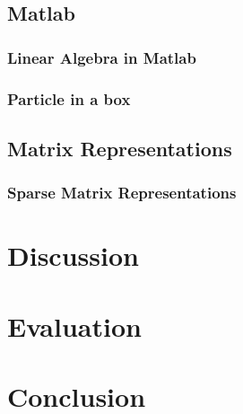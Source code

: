 \documentclass[authoryearcitations]{UoYCSproject}
\begin{document}
\section{Matlab}

\subsection{Linear Algebra in Matlab}


\subsection{Particle in a box}

\section{Matrix Representations}
\subsection{Sparse Matrix Representations}


\chapter{Discussion}

\chapter{Evaluation}

\chapter{Conclusion}


\end{document}
